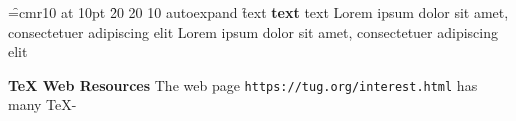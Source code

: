 



\pdfinterwordspaceon

\font\f=cmr10 at 10pt
\pdffontexpand\f 20 20 10 autoexpand
\f

text {\bf text} text
Lorem ipsum dolor sit amet, consectetuer adipiscing elit
Lorem ipsum dolor sit amet, consectetuer adipiscing elit


{\bf \TeX{} Web Resources} The web page
{\tt https://tug.org/interest.html} has many \TeX{}-

\bye
